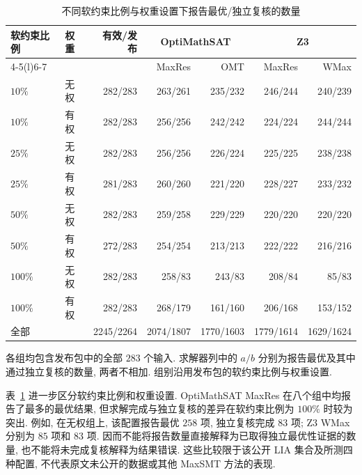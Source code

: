 \begin{table}[!ht]
\centering
\caption{不同软约束比例与权重设置下报告最优/独立复核的数量}
\label{tab:exp-public-maxsmt-groups}
\small
\begin{tabular}{@{}ll r rrrr@{}}
\toprule
软约束比例 & 权重 & 有效/发布 & \multicolumn{2}{c}{OptiMathSAT} & \multicolumn{2}{c}{Z3} \\
\cmidrule(lr){4-5}\cmidrule(l){6-7}
 & & & MaxRes & OMT & MaxRes & WMax \\
\midrule
$10\%$ & 无权 & 282/283 & 263/261 & 235/232 & 246/244 & 240/239 \\
$10\%$ & 有权 & 282/283 & 256/256 & 242/242 & 224/224 & 244/244 \\
$25\%$ & 无权 & 282/283 & 256/256 & 226/224 & 225/225 & 238/238 \\
$25\%$ & 有权 & 281/283 & 260/260 & 221/220 & 228/227 & 233/232 \\
$50\%$ & 无权 & 282/283 & 259/258 & 229/229 & 220/220 & 220/220 \\
$50\%$ & 有权 & 272/283 & 254/254 & 213/213 & 222/222 & 216/216 \\
$100\%$ & 无权 & 282/283 & 258/83 & 243/83 & 208/84 & 85/83 \\
$100\%$ & 有权 & 282/283 & 268/179 & 161/160 & 206/168 & 153/152 \\
\midrule
全部 & & 2245/2264 & 2074/1807 & 1770/1603 & 1779/1614 & 1629/1624 \\
\bottomrule
\end{tabular}
\par\smallskip
\begin{minipage}{\linewidth}\footnotesize 各组均包含发布包中的全部 $283$ 个输入. 求解器列中的 $a/b$ 分别为报告最优及其中通过独立复核的数量, 两者不相加. 组别沿用发布包的软约束比例与权重设置.
\end{minipage}
\end{table}

表~\ref{tab:exp-public-maxsmt-groups} 进一步区分软约束比例和权重设置. OptiMathSAT MaxRes 在八个组中均报告了最多的最优结果, 但求解完成与独立复核的差异在软约束比例为 $100\%$ 时较为突出. 例如, 在无权组上, 该配置报告最优 $258$ 项, 独立复核完成 $83$ 项; Z3 WMax 分别为 $85$ 项和 $83$ 项. 因而不能将报告数量直接解释为已取得独立最优性证据的数量, 也不能将未完成复核解释为结果错误. 这些比较限于该公开 LIA 集合及所测四种配置, 不代表原文未公开的数据或其他 MaxSMT 方法的表现.
